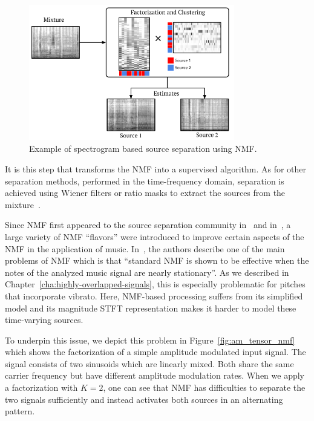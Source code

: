 \begin{figure}[h]
  \centering
  \includegraphics[width=0.8\textwidth]{Chapters/06_Separation_Unknown/figures/nmf_separation.pdf}
  \caption{Example of spectrogram based source separation using \ac{NMF}.}
  \label{fig:nmf_separation}
\end{figure}

It is this step that transforms the \acs{NMF} into a supervised algorithm.
As for other separation methods, performed in the time-frequency domain, separation is achieved using Wiener filters or ratio masks to extract the sources from the mixture~\cite{liutkus15c}.
\par
Since \acs{NMF} first appeared to the source separation community in~\cite{smaragdis03} and in~\cite{vembu05}, a large variety of NMF ``flavors'' were introduced to improve certain aspects of the \acs{NMF} in the application of music. 
In~\cite[Chapter 16]{vincent}, the authors describe one of the main problems of \acs{NMF} which is that ``standard \acs{NMF} is shown to be effective when the notes of the analyzed music signal are nearly stationary''.
As we described in Chapter~\ref{cha:highly-overlapped-signals}, this is especially problematic for pitches that incorporate vibrato.
Here, \acs{NMF}-based processing suffers from its simplified model and its magnitude \acs{STFT} representation makes it harder to model these time-varying sources.
\par
To underpin this issue, we depict this problem in Figure~\ref{fig:am_tensor_nmf} which shows the factorization of a simple amplitude modulated input signal. 
The signal consists of two sinusoids which are linearly mixed. 
Both share the same carrier frequency but have different amplitude modulation rates. 
When we apply a factorization with $K=2$, one can see that \acs{NMF} has difficulties to separate the two signals sufficiently and instead activates both sources in an alternating pattern.

